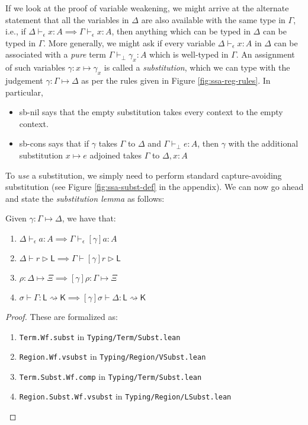 \documentclass[acmsmall,screen,review]{acmart}
\newcommand{\ms}[1]{\ensuremath{\mathsf{#1}}}
\newcommand{\bhyp}[2]{#1 : #2}
\newcommand{\hasty}[4]{#1 \vdash_{#2} #3: {#4}}
\newcommand{\haslb}[3]{#1 \vdash #2 \rhd #3}
\newcommand{\issubst}[3]{#1: #2 \mapsto #3}
\newcommand{\lbsubst}[4]{#1 \vdash #2: #3 \rightsquigarrow #4}
\newcommand{\brle}[1]{{\textsf{#1}}}
\begin{document}
If we look at the proof of variable weakening, we might arrive at the alternate statement that all
the variables in $\Delta$ are also available with the same type in $\Gamma$, i.e., if
$\hasty{\Delta}{\epsilon}{x}{A} \implies \hasty{\Gamma}{\epsilon}{x}{A}$, then anything which can be
typed in $\Delta$ can be typed in $\Gamma$. More generally, we might ask if every variable
$\hasty{\Delta}{\epsilon}{x}{A}$ in $\Delta$ can be associated with a \emph{pure} term
$\hasty{\Gamma}{\bot}{\gamma_x}{A}$ which is well-typed in $\Gamma$. An assignment of such variables
$\gamma : x \mapsto \gamma_x$ is called a \emph{substitution}, which we can type with the judgement
$\issubst{\gamma}{\Gamma}{\Delta}$ as per the rules given in Figure \ref{fig:ssa-reg-rules}. In
particular,
\begin{itemize}
  \item \brle{sb-nil} says that the empty substitution takes every context to the empty context.
  \item \brle{sb-cons} says that if $\gamma$ takes $\Gamma$ to $\Delta$ and
  $\hasty{\Gamma}{\bot}{e}{A}$, then $\gamma$ with the additional substitution $x \mapsto e$
  adjoined takes $\Gamma$ to $\Delta, \bhyp{x}{A}$
\end{itemize}
To \emph{use} a substitution, we simply need to perform standard capture-avoiding substitution (see
Figure \ref{fig:ssa-subst-def} in the appendix). We can now go ahead and state the
\emph{substitution lemma} as follows:
\begin{lemma}[Substitution]
  Given $\issubst{\gamma}{\Gamma}{\Delta}$, we have that:
  \begin{enumerate}[label=(\alph*)]
    \item $\hasty{\Delta}{\epsilon}{a}{A} \implies \hasty{\Gamma}{\epsilon}{[\gamma]a}{A}$ 
    \item $\haslb{\Delta}{r}{\ms{L}} \implies \haslb{\Gamma}{[\gamma]r}{\ms{L}}$
    \item $\issubst{\rho}{\Delta}{\Xi} \implies \issubst{[\gamma]\rho}{\Gamma}{\Xi}$
    \item $\lbsubst{\sigma}{\Gamma}{\ms{L}}{\ms{K}} \implies \lbsubst{[\gamma]\sigma}{\Delta}{\ms{L}}{\ms{K}}$
  \end{enumerate}
\end{lemma}
\begin{proof}
  These are formalized as:
  \begin{enumerate}[label=(\alph*)]
    \item \texttt{Term.Wf.subst} in \texttt{Typing/Term/Subst.lean}
    \item \texttt{Region.Wf.vsubst} in \texttt{Typing/Region/VSubst.lean}
    \item \texttt{Term.Subst.Wf.comp} in \texttt{Typing/Term/Subst.lean}
    \item \texttt{Region.Subst.Wf.vsubst} in \texttt{Typing/Region/LSubst.lean}
  \end{enumerate}
\end{proof}
\end{document}
